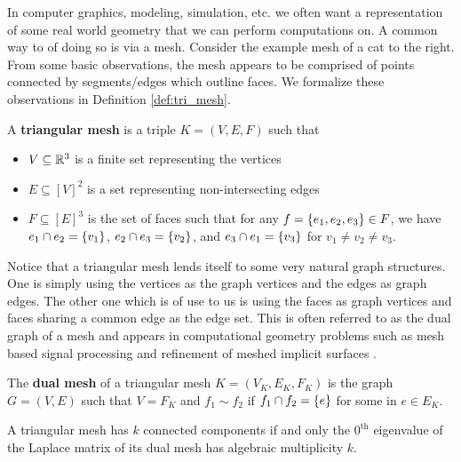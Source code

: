 \documentclass[12pt]{article}
\begin{document}
In computer graphics, modeling, simulation, etc. we often want a representation of some real world geometry that we can perform computations on. A common way to of doing so is via a mesh. Consider the example mesh of a cat to the right. From some basic observations, the mesh appears to be comprised of points connected by segments/edges which outline faces. We formalize these observations in Definition \ref{def:tri_mesh}.

\begin{definition}
    \label{def:tri_mesh}
    A \textbf{triangular mesh} is a triple $K = (V, E, F)$ such that
    \begin{itemize}
        \item $V \subseteq \mathbb{R}^3$ is a finite set representing the vertices
        \item $E \subseteq [V]^2$ is a set representing non-intersecting edges
        \item $F \subseteq [E]^3$ is the set of faces such that for any $f = \qty{e_1, e_2, e_3} \in F$, we have $e_1 \cap e_2 = \qty{v_1}$, $e_2 \cap e_3 = \qty{v_2}$, and $e_3 \cap e_1 = \qty{v_3}$ for $v_1 \neq v_2 \neq v_3$. 
    \end{itemize}
\end{definition}

Notice that a triangular mesh lends itself to some very natural graph structures. One is simply using the vertices as the graph vertices and the edges as graph edges. The other one which is of use to us is using the faces as graph vertices and faces sharing a common edge as the edge set. This is often referred to as the dual graph of a mesh and appears in computational geometry problems such as mesh based signal processing \cite{taubinDualMeshResampling2002} and refinement of meshed implicit surfaces \cite{10.1145/566282.566308}. 

\begin{definition}
    The \textbf{dual mesh} of a triangular mesh $K = (V_K, E_K, F_K)$ is the graph $G = (V, E)$ such that $V = F_K$ and $f_1 \sim f_2$ if $f_1 \cap f_2 = \qty{e}$ for some in $e \in E_K$.
\end{definition}

\begin{theorem}
    A triangular mesh has $k$ connected components if and only the $0^\text{th}$ eigenvalue of the Laplace matrix of its dual mesh has algebraic multiplicity $k$.
\end{theorem}

\newpage
\nocite{merrisLaplacianMatricesGraphs1994}
\printbibliography
\end{document}
